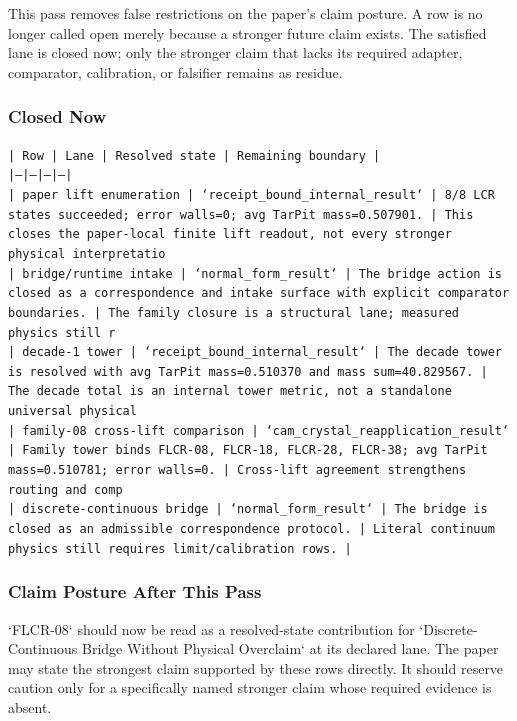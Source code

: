 \documentclass[11pt]{article}
\begin{document}
This pass removes false restrictions on the paper's claim posture. A row is no longer called open merely because a stronger future claim exists. The satisfied lane is closed now; only the stronger claim that lacks its required adapter, comparator, calibration, or falsifier remains as residue.

\subsubsection*{Closed Now}

\noindent\texttt{| Row | Lane | Resolved state | Remaining boundary |}\\
\noindent\texttt{|---|---|---|---|}\\
\noindent\texttt{| paper lift enumeration | `receipt\_bound\_internal\_result` | 8/8 LCR states succeeded; error walls=0; avg TarPit mass=0.507901. | This closes the paper-local finite lift readout, not every stronger physical interpretatio}\\
\noindent\texttt{| bridge/runtime intake | `normal\_form\_result` | The bridge action is closed as a correspondence and intake surface with explicit comparator boundaries. | The family closure is a structural lane; measured physics still r}\\
\noindent\texttt{| decade-1 tower | `receipt\_bound\_internal\_result` | The decade tower is resolved with avg TarPit mass=0.510370 and mass sum=40.829567. | The decade total is an internal tower metric, not a standalone universal physical }\\
\noindent\texttt{| family-08 cross-lift comparison | `cam\_crystal\_reapplication\_result` | Family tower binds FLCR-08, FLCR-18, FLCR-28, FLCR-38; avg TarPit mass=0.510781; error walls=0. | Cross-lift agreement strengthens routing and comp}\\
\noindent\texttt{| discrete-continuous bridge | `normal\_form\_result` | The bridge is closed as an admissible correspondence protocol. | Literal continuum physics still requires limit/calibration rows. |}\\

\subsubsection*{Claim Posture After This Pass}

`FLCR-08` should now be read as a resolved-state contribution for `Discrete-Continuous Bridge Without Physical Overclaim` at its declared lane. The paper may state the strongest claim supported by these rows directly. It should reserve caution only for a specifically named stronger claim whose required evidence is absent.
\end{document}
